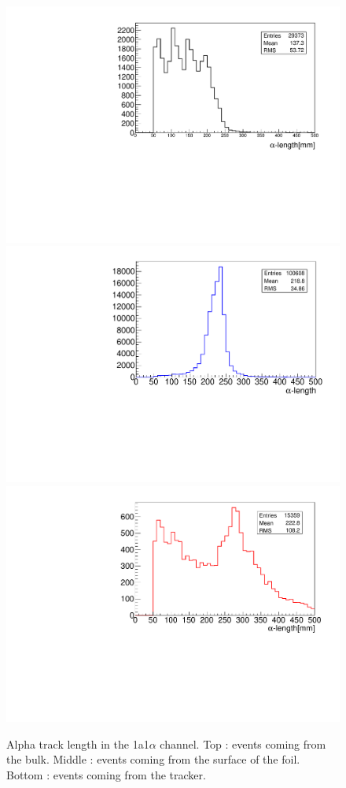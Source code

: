 \documentclass[main.tex]{subfiles}
\begin{document}
\begin{figure}[h!]
\begin{center}
\includegraphics[scale=0.39]{pictures/Chap5/alpha_length_bulk_1M.pdf}
\includegraphics[scale=0.39]{pictures/Chap5/alpha_length_surface_1M.pdf}
\includegraphics[scale=0.39]{pictures/Chap5/alpha_length_tracker_1M.pdf}
\caption{Alpha track length in the 1a1$\alpha$ channel. Top : events coming from the bulk. Middle : events coming from the surface of the foil. Bottom : events coming from the tracker.}
\label{alpha_length_source_selection}
\end{center}
\end{figure}
\end{document}
